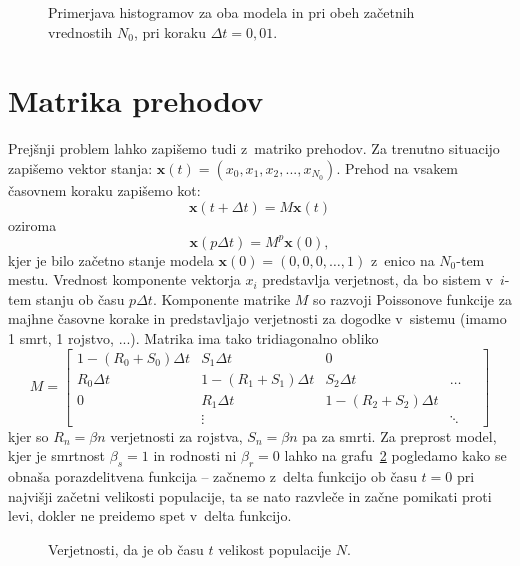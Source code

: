 \documentclass[a4paper,pdftex,11pt]{article}
\renewcommand{\vec}[1]{\boldsymbol{\mathbf{#1}}}
\numberwithin{figure}{section} %
\begin{document}
\begin{figure}    
    \centering 
    \resizebox{0.49\textwidth}{!}{} 
    \resizebox{0.49\textwidth}{!}{} 
    \caption{Primerjava histogramov za oba modela in pri obeh začetnih vrednostih $N_0$,
    pri koraku $\Delta t=0,01$.}
    \label{slika7}
\end{figure}
\pagebreak

\section{Matrika prehodov}
Prejšnji problem lahko zapišemo tudi z~matriko prehodov. Za trenutno situacijo zapišemo 
vektor stanja: $\vec{x}(t) = (x_0,x_1,x_2,...,x_{N_0})$. Prehod na vsakem časovnem koraku 
zapišemo kot:
\begin{equation}
    \vec{x} (t+\Delta t) = M \vec{x} (t)
\end{equation}
oziroma
\begin{equation}
    \vec{x} (p \Delta t) = M^p \vec{x} (0),
\end{equation}
kjer je bilo začetno stanje modela $\vec{x}(0) = (0,0,0,\dots, 1)$ z~enico na $N_0$-tem
mestu. Vrednost komponente vektorja $x_i$ predstavlja verjetnost, da bo sistem v~$i$-tem 
stanju ob času $p \Delta t$. Komponente matrike $M$ so razvoji Poissonove funkcije za majhne
časovne korake in predstavljajo verjetnosti za dogodke v~sistemu (imamo 1 smrt, 
1 rojstvo, ...). Matrika ima tako tridiagonalno obliko
\begin{equation}
    M = 
    \begin{bmatrix}
	1 - (R_0 + S_0)\Delta t  & S_1\Delta t	& 0 \\
	R_0\Delta t  & 1 - (R_1 + S_1)\Delta t & S_2\Delta t & \dots \quad \\
	0 & R_1\Delta t  & 1 - (R_2 + S_2)\Delta t \\
	& \vdots & & \ddots
    \end{bmatrix}
\end{equation}
kjer so $R_n = \beta n$ verjetnosti za rojstva, $S_n = \beta n$ pa za smrti.
Za preprost model, kjer je smrtnost $\beta_s=1$ in rodnosti ni $\beta_r=0$ lahko 
na grafu~\ref{slika20} pogledamo kako se obnaša porazdelitvena funkcija -- začnemo z~delta
funkcijo ob času $t=0$ pri najvišji začetni velikosti populacije, ta se nato razvleče
in začne pomikati proti levi, dokler ne preidemo spet v~delta funkcijo.
\begin{figure}[H] 
    \centering 
    \resizebox{0.49\textwidth}{!}{} 
    \resizebox{0.49\textwidth}{!}{} 
    \caption{Verjetnosti, da je ob času $t$ velikost populacije $N$.}
    \label{slika20}
\end{figure}
\end{document}
